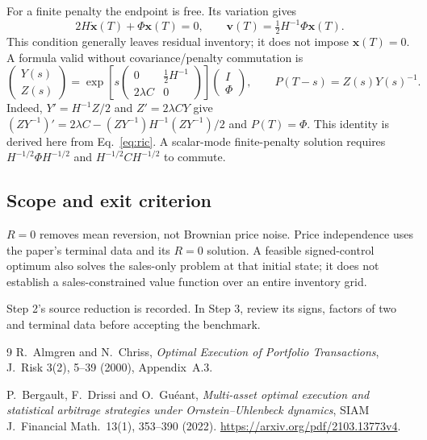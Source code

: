 \documentclass[11pt,a4paper]{article}
\begin{document}
For a finite penalty the endpoint is free. Its variation gives
\[
 2H\dot{\mathbf x}(T)+\Phi\mathbf x(T)=0,
 \qquad\mathbf v(T)=\tfrac12H^{-1}\Phi\mathbf x(T).
\]
This condition generally leaves residual inventory; it does not impose
$\mathbf x(T)=0$. A formula valid without covariance/penalty commutation is
\begin{equation}
 \begin{pmatrix}Y(s)\\Z(s)\end{pmatrix}
 =\exp\!\left[s\begin{pmatrix}0&\tfrac12H^{-1}\\2\lambda C&0\end{pmatrix}\right]
 \begin{pmatrix}I\\\Phi\end{pmatrix},\qquad P(T-s)=Z(s)Y(s)^{-1}.
 \label{eq:finite-penalty}
\end{equation}
Indeed, $Y'=H^{-1}Z/2$ and $Z'=2\lambda CY$ give
$(ZY^{-1})'=2\lambda C-(ZY^{-1})H^{-1}(ZY^{-1})/2$ and $P(T)=\Phi$.
This identity is derived here from Eq.~\eqref{eq:ric}. A scalar-mode
finite-penalty solution requires $H^{-1/2}\Phi H^{-1/2}$ and
$H^{-1/2}CH^{-1/2}$ to commute.

\subsection*{Scope and exit criterion}

$R=0$ removes mean reversion, not Brownian price noise. Price independence
uses the paper's terminal data and its $R=0$ solution. A feasible signed-control
optimum also solves the sales-only problem at that initial state; it does
not establish a sales-constrained value function over an entire inventory grid.

Step 2's source reduction is recorded. In Step 3, review its signs, factors
of two and terminal data before accepting the benchmark.

\begin{thebibliography}{9}
 R.~Almgren and N.~Chriss,
\emph{Optimal Execution of Portfolio Transactions}, J.~Risk 3(2), 5--39
(2000), Appendix~A.3.

 P.~Bergault, F.~Drissi and O.~Gu\'eant,
\emph{Multi-asset optimal execution and statistical arbitrage strategies
under Ornstein--Uhlenbeck dynamics}, SIAM J.~Financial Math.~13(1),
353--390 (2022). \url{https://arxiv.org/pdf/2103.13773v4}.

\end{thebibliography}
\end{document}
